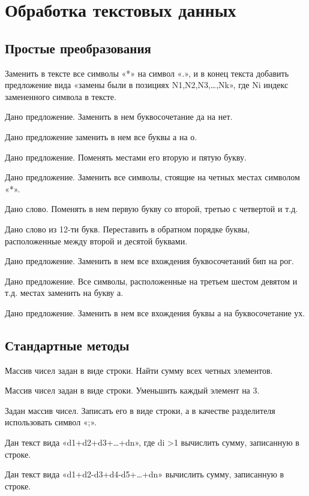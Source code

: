 \section{Обработка текстовых данных}

\subsection{Простые преобразования}

\task Заменить в тексте все символы «*» на символ «.», и в конец
текста добавить предложение вида «замены были в позициях
  N1,N2,N3,…,Nk», где Ni индекс замененного символа в тексте.

\task Дано предложение. Заменить в нем буквосочетание да на нет.

\task Дано предложение заменить в нем все буквы а на о.

\task Дано предложение. Поменять местами его вторую и пятую букву.

\task Дано предложение. Заменить все символы, стоящие на четных местах
символом «*».

\task Дано слово. Поменять в нем первую букву со второй, третью с
четвертой и т.д.

\task Дано слово из 12-ти букв. Переставить в обратном порядке буквы,
расположенные между второй и десятой буквами.

\task Дано предложение. Заменить в нем все вхождения буквосочетаний
бип на рог.

\task Дано предложение. Все символы, расположенные на третьем шестом
девятом и т.д. местах заменить на букву а.

\task Дано предложение. Заменить в нем все вхождения буквы а на
буквосочетание ух.


\subsection{Стандартные методы}

\task Массив чисел задан в виде строки. Найти сумму всех четных
элементов.

\task Массив чисел задан в виде строки. Уменьшить каждый элемент на 3.

\task Задан массив чисел. Записать его в виде строки, а в качестве
разделителя использовать символ «;».

\task Дан текст вида «d1+d2+d3+…+dn», где di >1 вычислить сумму,
записанную в строке.

\task Дан текст вида «d1+d2-d3+d4-d5+…+dn» вычислить сумму, записанную
в строке.

